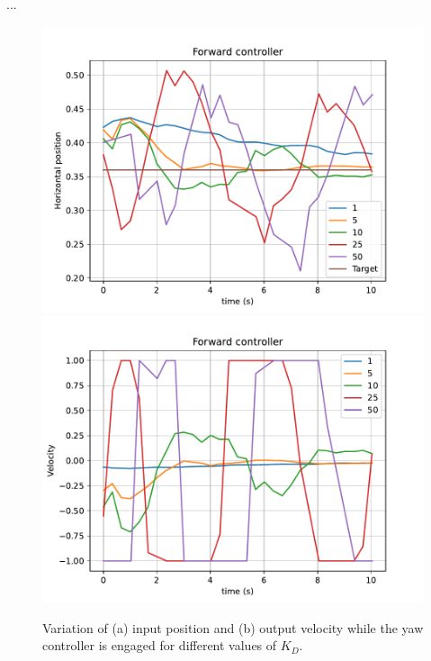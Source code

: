 ...

\begin{figure}
  \centering
  \includegraphics[width=.45\linewidth]{img/4.1-tune/fwd_p1_feedback.pdf}
  \includegraphics[width=.45\linewidth]{img/4.1-tune/fwd_p1_speed.pdf}
  \caption{Variation of (a) input position and (b) output velocity while the yaw controller is engaged for different values of $K_{D}$.}\label{fig:tune-yaw-deriv}
\end{figure}




